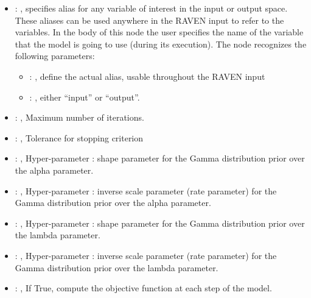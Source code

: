 \begin{itemize}
    \item {}: , 
      specifies alias for         any variable of interest in the input or output space. These
      aliases can be used anywhere in the RAVEN input to         refer to the variables. In the body
      of this node the user specifies the name of the variable that the model is going to use
      (during its execution).
      The  node recognizes the following parameters:
        \begin{itemize}
          \item {}: , 
            define the actual alias, usable throughout the RAVEN input
          \item {}: , 
            either ``input'' or ``output''.
      \end{itemize}

    \item {}: , 
      Maximum number of iterations.

    \item {}: , 
      Tolerance for stopping criterion

    \item {}: , 
      Hyper-parameter : shape parameter for the Gamma
      distribution prior over the alpha parameter.

    \item {}: , 
      Hyper-parameter : inverse scale parameter (rate parameter)
      for the Gamma distribution prior over the alpha parameter.

    \item {}: , 
      Hyper-parameter : shape parameter for the Gamma distribution
      prior over the lambda parameter.

    \item {}: , 
      Hyper-parameter : inverse scale parameter (rate parameter) for
      the Gamma distribution prior over the lambda parameter.

    \item {}: , 
      If True, compute the objective function at each step of the
      model.


\end{itemize}
